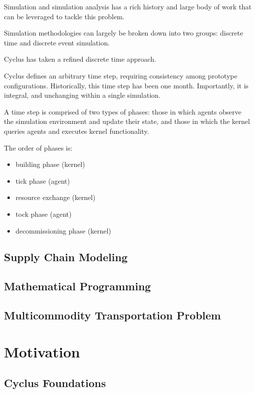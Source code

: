 Simulation and simulation analysis has a rich history and large body of work
that can be leveraged to tackle this problem.

Simulation methodologies can largely be broken down into two groups: discrete
time and discrete event simulation. 

Cyclus has taken a refined discrete time approach.

Cyclus defines an arbitrary time step, requiring consistency among prototype
configurations. Historically, this time step has been one month. Importantly, it
is integral, and unchanging within a single simulation.

A time step is comprised of two types of phases: those in which agents observe
the simulation environment and update their state, and those in which the kernel
queries agents and executes kernel functionality.

The order of phases is:

\begin{itemize}
  \item building phase (kernel)
  \item tick phase (agent)
  \item resource exchange (kernel)
  \item tock phase (agent)
  \item decommissioning phase (kernel)
\end{itemize}

\subsection{Supply Chain Modeling}

\subsection{Mathematical Programming}

\subsection{Multicommodity Transportation Problem}\label{intro:mtp}

\section{Motivation}

\subsection{Cyclus Foundations}\label{intro:cyc}

